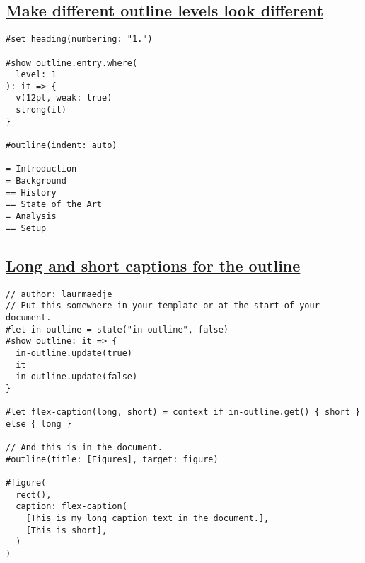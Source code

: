 \pandocbounded{}

\subsection{\texorpdfstring{\hyperref[make-different-outline-levels-look-different]{Make
different outline levels look
different}}{Make different outline levels look different}}\label{make-different-outline-levels-look-different}

\begin{verbatim}
#set heading(numbering: "1.")

#show outline.entry.where(
  level: 1
): it => {
  v(12pt, weak: true)
  strong(it)
}

#outline(indent: auto)

= Introduction
= Background
== History
== State of the Art
= Analysis
== Setup
\end{verbatim}

\pandocbounded{}

\subsection{\texorpdfstring{\hyperref[long-and-short-captions-for-the-outline]{Long
and short captions for the
outline}}{Long and short captions for the outline}}\label{long-and-short-captions-for-the-outline}

\begin{verbatim}
// author: laurmaedje
// Put this somewhere in your template or at the start of your document.
#let in-outline = state("in-outline", false)
#show outline: it => {
  in-outline.update(true)
  it
  in-outline.update(false)
}

#let flex-caption(long, short) = context if in-outline.get() { short } else { long }

// And this is in the document.
#outline(title: [Figures], target: figure)

#figure(
  rect(),
  caption: flex-caption(
    [This is my long caption text in the document.],
    [This is short],
  )
)
\end{verbatim}

\pandocbounded{}


